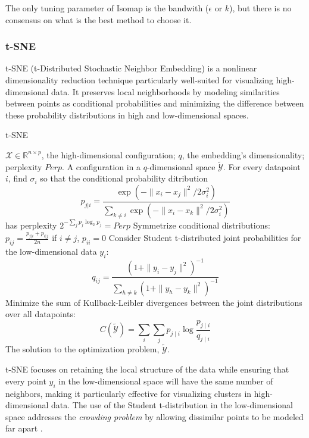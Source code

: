The only tuning parameter of Isomap is the bandwith ($\epsilon$ or $k$), but there is no consensus on what is the best method to choose it.

\subsubsection{t-SNE}

t-SNE (t-Distributed Stochastic Neighbor Embedding) \cite{tsne} is a nonlinear dimensionality reduction technique particularly well-suited for visualizing high-dimensional data. It preserves local neighborhoods by modeling similarities between points as conditional probabilities and minimizing the difference between these probability distributions in high and low-dimensional spaces.

\begin{algorithm}
    \caption{t-SNE}
    \label{alg:tSNE}
    
    \begin{algorithmic}[1]
    \REQUIRE $\mathcal{X} \in \mathbb{R}^{n \times p}$, the high-dimensional configuration; $q$, the embedding's dimensionality; perplexity $Perp$.
    \ENSURE A configuration in a $q$-dimensional space $\tilde{\mathcal{Y}}$.
    \STATE For every datapoint $i$, find $\sigma_i$ so that the conditional probability ditribution
        $$p_{j|i} = \frac{\exp(-\|x_i-x_j\|^2/2\sigma_i^2)}{\sum_{k \neq i}\exp(-\|x_i-x_k\|^2/2\sigma_i^2)}$$ has perplexity $2^{-\sum_{j}p_j \log_2 p_j} = Perp$
    \STATE Symmetrize conditional distributions: $p_{ij} = \frac{p_{j|i} + p_{i|j}}{2n}$ if $i\neq j$, $p_{ii} = 0$
    \STATE Consider Student t-distributed joint probabilities for the low-dimensional data $y_i$: $$q_{ij} = \frac{(1 + \|y_i-y_j\|^2)^{-1}}{\sum_{h \neq k}(1 + \|y_h-y_k\|^2)^{-1}}$$
    \STATE Minimize the sum of Kullback-Leibler divergences between the joint distributions over all datapoints: $$C(\tilde{\mathcal{Y}})=\sum_i \sum_j p_{j \mid i} \log \frac{p_{j \mid i}}{q_{j \mid i}}$$
    \RETURN The solution to the optimization problem, $\tilde{\mathcal{Y}}$.
    
    \end{algorithmic}
\end{algorithm}

t-SNE focuses on retaining the local structure of the data while ensuring that every point $y_i$ in the low-dimensional space will have the same number of neighbors, making it particularly effective for visualizing clusters in high-dimensional data. The use of the Student t-distribution in the low-dimensional space addresses the \textit{crowding problem} by allowing dissimilar points to be modeled far apart \cite{tsne}.


